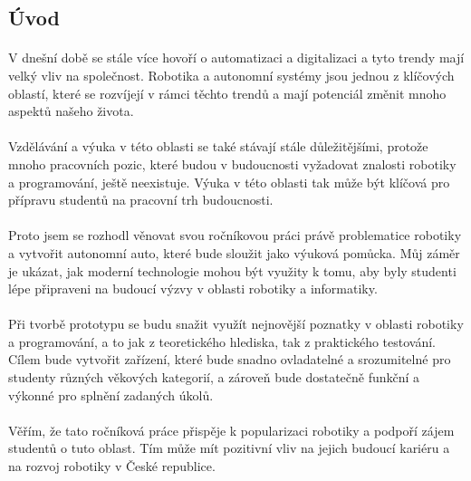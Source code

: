 \documentclass[12pt]{article}
\begin{document}
\begin{spacing}{1.5}
	\newpage
	\tableofcontents
	
	\newpage
	\section*{Úvod}
	\paragraph{} V dnešní době se stále více hovoří o automatizaci a digitalizaci a tyto trendy mají velký vliv na společnost. Robotika a autonomní systémy jsou jednou z klíčových oblastí, které se rozvíjejí v rámci těchto trendů a mají potenciál změnit mnoho aspektů našeho života.
	\paragraph{} Vzdělávání a výuka v této oblasti se také stávají stále důležitějšími, protože mnoho pracovních pozic, které budou v budoucnosti vyžadovat znalosti robotiky a programování, ještě neexistuje. Výuka v této oblasti tak může být klíčová pro přípravu studentů na pracovní trh budoucnosti.
	\paragraph{} Proto jsem se rozhodl věnovat svou ročníkovou práci právě problematice robotiky a vytvořit autonomní auto, které bude sloužit jako výuková pomůcka. Můj záměr je ukázat, jak moderní technologie mohou být využity k tomu, aby byly studenti lépe připraveni na budoucí výzvy v oblasti robotiky a informatiky.
	\paragraph{} Při tvorbě prototypu se budu snažit využít nejnovější poznatky v oblasti robotiky a programování, a to jak z teoretického hlediska, tak z praktického testování. Cílem bude vytvořit zařízení, které bude snadno ovladatelné a srozumitelné pro studenty různých věkových kategorií, a zároveň bude dostatečně funkční a výkonné pro splnění zadaných úkolů.
	\paragraph{} Věřím, že tato ročníková práce přispěje k popularizaci robotiky a podpoří zájem studentů o tuto oblast. Tím může mít pozitivní vliv na jejich budoucí kariéru a na rozvoj robotiky v České republice.
	

\end{spacing}
\end{document}
